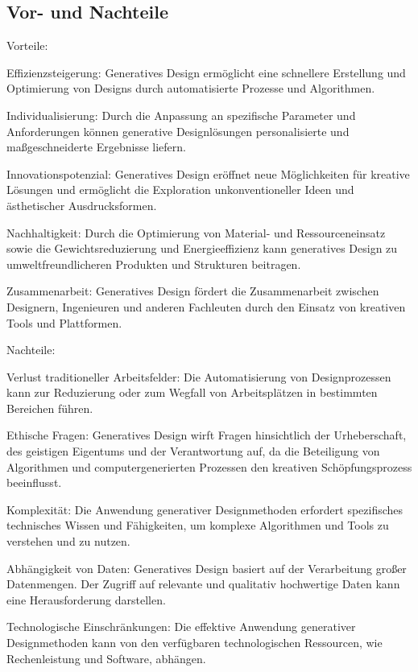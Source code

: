\subsection*{Vor- und Nachteile}
 Vorteile:

 Effizienzsteigerung: Generatives Design ermöglicht eine schnellere Erstellung und Optimierung von Designs durch automatisierte Prozesse und Algorithmen.
 
 Individualisierung: Durch die Anpassung an spezifische Parameter und Anforderungen können generative Designlösungen personalisierte und maßgeschneiderte Ergebnisse liefern.
 
 Innovationspotenzial: Generatives Design eröffnet neue Möglichkeiten für kreative Lösungen und ermöglicht die Exploration unkonventioneller Ideen und ästhetischer Ausdrucksformen.
 
 Nachhaltigkeit: Durch die Optimierung von Material- und Ressourceneinsatz sowie die Gewichtsreduzierung und Energieeffizienz kann generatives Design zu umweltfreundlicheren Produkten und Strukturen beitragen.
 
 Zusammenarbeit: Generatives Design fördert die Zusammenarbeit zwischen Designern, Ingenieuren und anderen Fachleuten durch den Einsatz von kreativen Tools und Plattformen. \autocite{12} \autocite*{13}
 
 Nachteile:
 
 Verlust traditioneller Arbeitsfelder: Die Automatisierung von Designprozessen kann zur Reduzierung oder zum Wegfall von Arbeitsplätzen in bestimmten Bereichen führen.
 
 Ethische Fragen: Generatives Design wirft Fragen hinsichtlich der Urheberschaft, des geistigen Eigentums und der Verantwortung auf, da die Beteiligung von Algorithmen und computergenerierten Prozessen den kreativen Schöpfungsprozess beeinflusst.
 
 Komplexität: Die Anwendung generativer Designmethoden erfordert spezifisches technisches Wissen und Fähigkeiten, um komplexe Algorithmen und Tools zu verstehen und zu nutzen.
 
 Abhängigkeit von Daten: Generatives Design basiert auf der Verarbeitung großer Datenmengen. Der Zugriff auf relevante und qualitativ hochwertige Daten kann eine Herausforderung darstellen.
 
 Technologische Einschränkungen: Die effektive Anwendung generativer Designmethoden kann von den verfügbaren technologischen Ressourcen, wie Rechenleistung und Software, abhängen. \autocite*{13}

